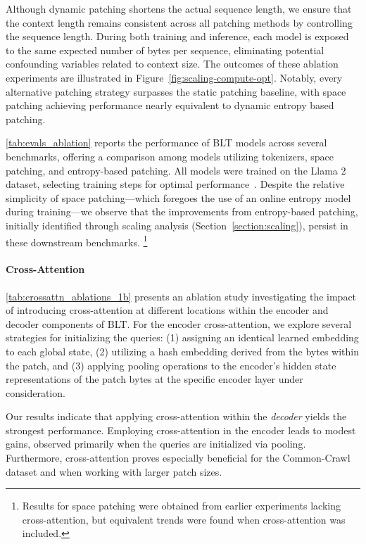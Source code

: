 Although dynamic patching shortens the actual sequence length, we ensure that the context length remains consistent across all patching methods by controlling the sequence length. During both training and inference, each model is exposed to the same expected number of bytes per sequence, eliminating potential confounding variables related to context size. The outcomes of these ablation experiments are illustrated in Figure~\ref{fig:scaling-compute-opt}. Notably, every alternative patching strategy surpasses the static patching baseline, with space patching achieving performance nearly equivalent to dynamic entropy based patching.

\autoref{tab:evals_ablation} reports the performance of {\textsc BLT} models across several benchmarks, offering a comparison among models utilizing tokenizers, space patching, and entropy-based patching. All models were trained on the Llama 2 dataset, selecting training steps for optimal performance~\citep{dubey2024llama}. Despite the relative simplicity of space patching—which foregoes the use of an online entropy model during training—we observe that the improvements from entropy-based patching, initially identified through scaling analysis (Section~\ref{section:scaling}), persist in these downstream benchmarks. \footnote{Results for space patching were obtained from earlier experiments lacking cross-attention, but equivalent trends were found when cross-attention was included.}

\paragraph{Cross-Attention} 
\autoref{tab:crossattn_ablations_1b} presents an ablation study investigating the impact of introducing cross-attention at different locations within the encoder and decoder components of {\textsc BLT}. For the encoder cross-attention, we explore several strategies for initializing the queries: (1) assigning an identical learned embedding to each global state, (2) utilizing a hash embedding derived from the bytes within the patch, and (3) applying pooling operations to the encoder's hidden state representations of the patch bytes at the specific encoder layer under consideration.

Our results indicate that applying cross-attention within the \textit{decoder} yields the strongest performance. Employing cross-attention in the encoder leads to modest gains, observed primarily when the queries are initialized via pooling. Furthermore, cross-attention proves especially beneficial for the Common-Crawl dataset and when working with larger patch sizes.

